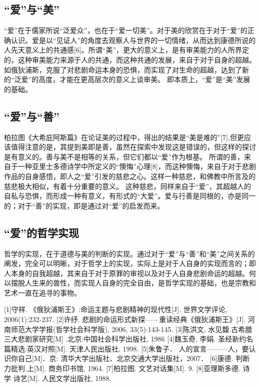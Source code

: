 \documentclass[lang=cn,11pt]{elegantpaper}
\begin{document}
\subsection{“爱”与“美”}
“爱”在于儒家所说“泛爱众”，也在于“爱一切美”。对于美的欣赏在于对于“爱”的正确认识。爱是以“见证人”的角度去观察人与世界的一切情绪，从而达到康德所说的人先天意义上的共通感[6]。所谓“美”，更大的意义上，是有审美能力的人所界定的，这种审美能力来源于人的共通，而这种共通的发展，来自于对于自身的超越。如俄狄浦斯，克服了对悲剧命运本身的恐惧，而实现了对生命的超越，达到了新的“泛爱”的高度，才能在更高层次的意义上谈审美。
即本质上，“爱”是“美”发展的基础。

\subsection{“爱”与“善”}
柏拉图《大希庇阿斯篇》在论证美的过程中，得出的结果是“美是难的”[7],但更应该值得注意的是，其提到美即是善，虽然在探索中发现这是错误的，但这样的探讨是有意义的。善与美不是相等的关系，但它们都以“爱”作为根基。
所谓的善，来自于一种亚里士多德诗学中所定义的“懊悔”心理[8]，而这种懊悔，来自于对于悲剧作品的自身感悟，即人之“爱”引发的慈悲之心。这样一种慈悲，和佛教中所言及的慈悲极大相似，有着十分重要的意义。
这种慈悲，同样来自于“爱”，其超越人的自私与恐惧，而形成一种有意义，有形式的“大爱”。爱与行善是同根的，亦是同一的；对于“善”的实现，即是通过对“爱”的启发而来。

\subsection{“爱”的哲学实现}
哲学的实现，在于道德与美的判断的实现。通过对于“爱”与“善”和“美”之间关系的阐发，完全可以明晰，对于哲学上的实现，实际上是对于人自身的实现而言的；即人本身的自我超越，其来自于对于原罪的审视以及对于人自身悲剧命运的超越。何以摆脱人生来的兽性，而实现人自身的完全自由，是哲学实现的基础，也是宗教和艺术一直在追寻的事物。

\begin{thebibliography}{1}

  [1]守祥. 《俄狄浦斯王》:命运主题与悲剧精神的现代性[J]. 世界文学评论, 2006(1):232-237.
  [2]许纾. 悲剧的命运形式新探——重读经典《俄狄浦斯王》[J]. 河南师范大学学报(哲学社会科学版), 2006, 33(5):143-145.
  [3]陈洪文, 水见馥.古希腊三大悲剧家研究[M] .北京:中国社会科学出版社, 1986
  [4]魏玉奇, 李娟. 圣经新约名篇精选:英汉对照[M]. 天津人民出版社, 1998.
  [5]朱鲁子． 人的宣言———人，要认识你自己[M]．京: 清华大学出版社、北京交通大学出版社，2007．
  [6]康德. 判断力批判.上[M]. 商务印书馆, 1964.
  [7]柏拉图. 文艺对话集[M]. 9.
  [8]亚理斯多德. 诗学 诗艺[M]. 人民文学出版社, 1988.
\end{thebibliography}
    
  
\end{document}
